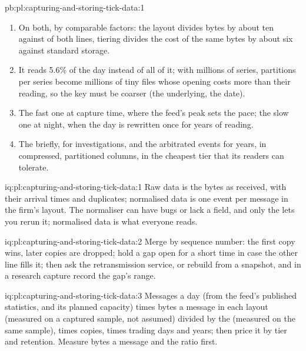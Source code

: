 \begin{solution}{pb:pl:capturing-and-storing-tick-data:1}
\begin{enumerate}
petabyte a year only in the lightest layout.
\item On both, by comparable factors: the layout divides bytes by about ten against  of both lines, tiering divides the
cost of the same bytes by about six against standard storage.
\item It reads 5.6\% of the day instead of all of it; with millions of series, partitions per series become millions of tiny
files whose opening costs more than their reading, so the key must be coarser (the underlying, the date).
\item The fast one at capture time, where the feed's peak sets the pace; the slow one at night, when the day is rewritten once
for years of reading.
\item The  briefly, for investigations, and the arbitrated events for years, in compressed, partitioned columns, in the
cheapest tier that its readers can tolerate.
\end{enumerate}
\end{solution}

\begin{solution}{iq:pl:capturing-and-storing-tick-data:1}
Raw data is the bytes as received, with their arrival times and duplicates; normalised data is one event per message in the
firm's layout. The normaliser can have bugs or lack a field, and only the  lets you rerun it; normalised data is what
everyone reads.
\end{solution}

\begin{solution}{iq:pl:capturing-and-storing-tick-data:2}
Merge by sequence number: the first copy wins, later copies are dropped; hold a gap open for a short time in case the other line
fills it; then ask the retransmission service, or rebuild from a snapshot, and in a research capture record the gap's range.
\end{solution}

\begin{solution}{iq:pl:capturing-and-storing-tick-data:3}
Messages a day (from the feed's published statistics, and its planned capacity) times bytes a message in each layout (measured
on a captured sample, not assumed) divided by the  (measured on the same sample), times copies, times trading
days and years; then price it by tier and retention. Measure bytes a message and the ratio first.
\end{solution}

